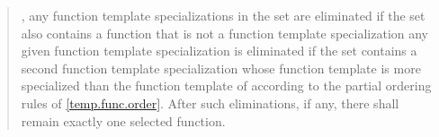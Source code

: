 \begin{quote}
\setcounter{Paras}{3}
\pnum
{}
%
, 
any function template specializations in the set are eliminated if the 
set also contains a function that is not a function template
specialization
% 
%
 any given function template specialization
 is eliminated if the set contains a second function 
template specialization whose function template is more specialized than 
the function template of  according to the partial ordering 
rules of \ref{temp.func.order}.
%
After such eliminations, if any, there shall remain exactly one 
selected function.
\end{quote}
